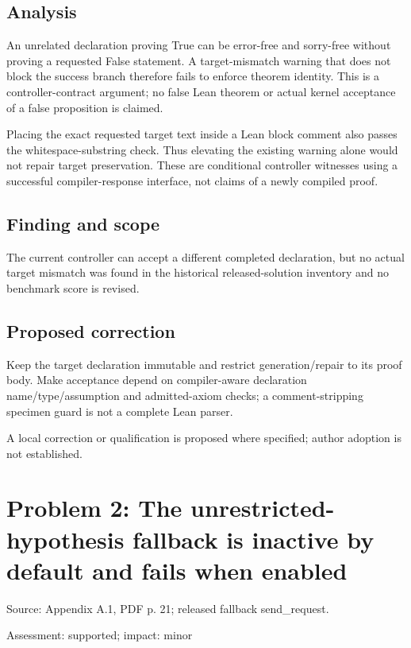 \documentclass[11pt]{article}
\begin{document}
\subsection*{Analysis}

An unrelated declaration proving True can be error-free and sorry-free without proving a requested False statement. A target-mismatch warning that does not block the success branch therefore fails to enforce theorem identity. This is a controller-contract argument; no false Lean theorem or actual kernel acceptance of a false proposition is claimed.

Placing the exact requested target text inside a Lean block comment also passes the whitespace-substring check. Thus elevating the existing warning alone would not repair target preservation. These are conditional controller witnesses using a successful compiler-response interface, not claims of a newly compiled proof.

\subsection*{Finding and scope}

The current controller can accept a different completed declaration, but no actual target mismatch was found in the historical released-solution inventory and no benchmark score is revised.

\subsection*{Proposed correction}

Keep the target declaration immutable and restrict generation/repair to its proof body. Make acceptance depend on compiler-aware declaration name/type/assumption and admitted-axiom checks; a comment-stripping specimen guard is not a complete Lean parser.

A local correction or qualification is proposed where specified; author adoption is not established.

\section*{Problem 2: The unrestricted-hypothesis fallback is inactive by default and fails when enabled}

Source: Appendix A.1, PDF p. 21; released fallback send\_request.

Assessment: supported; impact: minor
\end{document}
